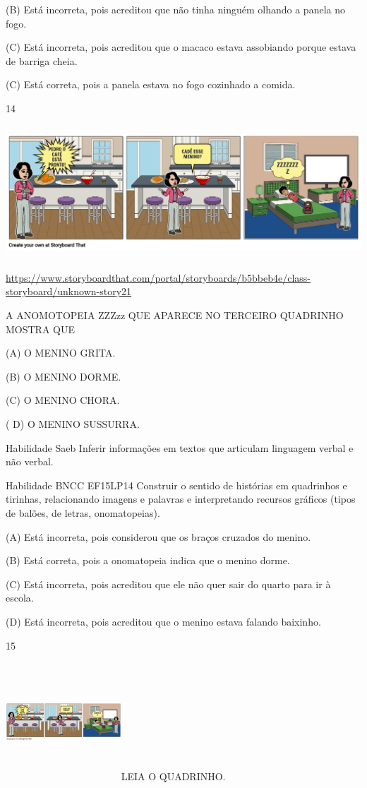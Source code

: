 {{{{{{(B) Está incorreta, pois acreditou que não tinha ninguém olhando a
panela no fogo.

(C) Está incorreta, pois acreditou que o macaco estava assobiando porque
estava de barriga cheia.

(C) Está correta, pois a panela estava no fogo cozinhado a comida.

\num{14}

\includegraphics[width=5.90556in,height=1.95556in]{media/image146.png}

\url{https://www.storyboardthat.com/portal/storyboards/b5bbeb4e/class-storyboard/unknown-story21}

A ANOMOTOPEIA ZZZzz QUE APARECE NO TERCEIRO QUADRINHO MOSTRA QUE

(A) O MENINO GRITA.

(B) O MENINO DORME.

(C) O MENINO CHORA.

( D) O MENINO SUSSURRA.

\protect\hypertarget{_Hlk129336975}{}{}Habilidade Saeb Inferir
informações em textos que articulam linguagem verbal e não verbal.

Habilidade BNCC EF15LP14 Construir o sentido de histórias em quadrinhos
e tirinhas, relacionando imagens e palavras e interpretando recursos
gráficos (tipos de balões, de letras, onomatopeias).

(A) Está incorreta, pois considerou que os braços cruzados do menino.

(B) Está correta, pois a onomatopeia indica que o menino dorme.

(C) Está incorreta, pois acreditou que ele não quer sair do quarto para
ir à escola.

(D) Está incorreta, pois acreditou que o menino estava falando baixinho.

\num{15}

\includegraphics[width=1.70556in,height=1.74444in]{media/image146.png}LEIA
O QUADRINHO.

}}}}}}
